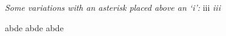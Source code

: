 \documentclass[a4paper,12pt]{book}
\begin{document}
{
\textit{Some variations with an asterisk placed above an `i':}
i\upaccent{\tiny *}{\i}i\upaccent{\tiny *}{\i}i\upaccent{\tiny *}{\i}
\textit{i\upaccent{\tiny *}{\i}i\upaccent{\tiny *}{\i}i\upaccent{\tiny *}{\i}}
}

abde
abde
abde
\end{document}
